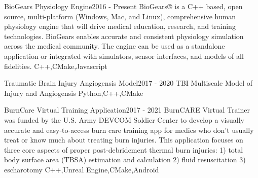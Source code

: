 %
%
%


\begin{projects}
	\project
	{BioGears Physiology Engine}{2016 - Present}
	{} 
	{BioGears® is a C++ based, open source, multi-platform (Windows, Mac, and Linux), comprehensive human physiology engine that will drive medical education, research, and training technologies. BioGears enables accurate and consistent physiology simulation across the medical community. The engine can be used as a standalone application or integrated with simulators, sensor interfaces, and models of all fidelities.}  
	{C++,CMake,Javascript}
				
	\project
	{Traumatic Brain Injury Angiogensis Model}{2017 - 2020}
	{} 
	{TBI Multiscale Model of Injury and Angiogensis}
	{Python,C++,CMake}

	\project
	{BurnCare Virtual Training Application}{2017 - 2021}
	{} 
	{BurnCARE Virtual Trainer was funded by the U.S. Army DEVCOM Soldier Center to develop a visually accurate and easy-to-access burn care training app for medics who don’t usually treat or know much about treating burn injuries. This application focuses on three core aspects of proper post-debridement thermal burn injuries:
	1) total body surface area (TBSA) estimation and calculation
	2) fluid resuscitation
	3) escharotomy}
	{C++,Unreal Engine,CMake,Android}

\end{projects}

